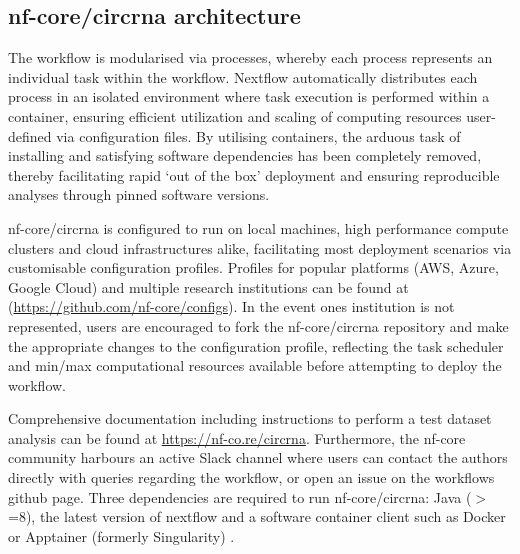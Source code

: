 \documentclass{bmcart}
\begin{document}
\subsection*{\textbf{nf-core/circrna architecture}}
The workflow is modularised via processes, whereby each process represents an individual task within the workflow. Nextflow automatically distributes each process in an isolated environment where task execution is performed within a container, ensuring efficient utilization and scaling of computing resources user-defined via configuration files. By utilising containers, the arduous task of installing and satisfying software dependencies has been completely removed, thereby facilitating rapid `out of the box' deployment and ensuring reproducible analyses through pinned software versions.
\par
nf-core/circrna is configured to run on local machines, high performance compute clusters and cloud infrastructures alike, facilitating most deployment scenarios via customisable configuration profiles. Profiles for popular platforms (AWS, Azure, Google Cloud) and multiple research institutions can be found at (\url{https://github.com/nf-core/configs}). In the event ones institution is not represented, users are encouraged to fork the nf-core/circrna repository and make the appropriate changes to the configuration profile, reflecting the task scheduler and min/max computational resources available before attempting to deploy the workflow.
\par
Comprehensive documentation including instructions to perform a test dataset analysis can be found at \url{https://nf-co.re/circrna}. Furthermore, the nf-core community harbours an active Slack channel where users can contact the authors directly with queries regarding the workflow, or open an issue on the workflows github page. Three dependencies are required to run nf-core/circrna: Java ($>$=8), the latest version of nextflow \cite{DiTommaso2017Apr} and a software container client such as Docker \cite{Docker} or Apptainer (formerly Singularity) \cite{Singularity}.
\end{document}
